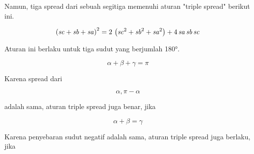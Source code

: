 \documentclass[a4paper,10pt]{article}
\begin{document}
\begin{eulernotebook}
\begin{eulercomment}
\begin{eulercomment}
\begin{eulercomment}
\begin{eulercomment}
\begin{eulercomment}
Namun, tiga spread dari sebuah segitiga memenuhi aturan "triple
spread" berikut ini.
\end{eulercomment}
\begin{eulerformula}
\[
\left({\it sc}+{\it sb}+{\it sa}\right)^2=2\,\left({\it sc}^2+  {\it sb}^2+{\it sa}^2\right)+4\,{\it sa}\,{\it sb}\,{\it sc}
\]
\end{eulerformula}
\begin{eulercomment}
Aturan ini berlaku untuk tiga sudut yang berjumlah 180°.

\end{eulercomment}
\begin{eulerformula}
\[
\alpha+\beta+\gamma=\pi
\]
\end{eulerformula}
\begin{eulercomment}
Karena spread dari

\end{eulercomment}
\begin{eulerformula}
\[
\alpha, \pi-\alpha
\]
\end{eulerformula}
\begin{eulercomment}
adalah sama, aturan triple spread juga benar, jika

\end{eulercomment}
\begin{eulerformula}
\[
\alpha+\beta=\gamma
\]
\end{eulerformula}
\begin{eulercomment}
Karena penyebaran sudut negatif adalah sama, aturan triple spread juga
berlaku, jika


\end{eulercomment}
\end{eulercomment}
\end{eulercomment}
\end{eulercomment}
\end{eulercomment}
\end{eulernotebook}
\end{document}
